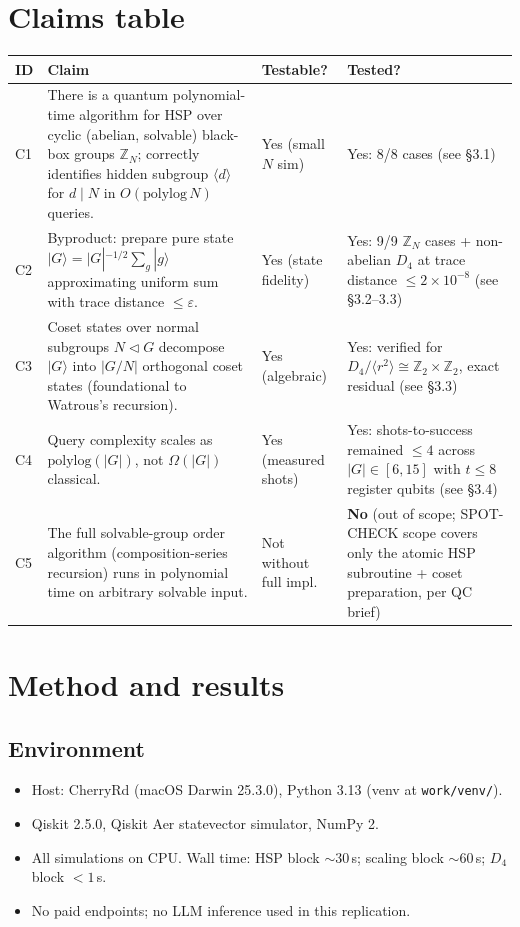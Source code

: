 \documentclass[11pt]{article}
\begin{document}
\section{Claims table}
\begin{center}\small
\begin{tabular}{@{}lp{7.5cm}ll@{}}
\toprule
\textbf{ID} & \textbf{Claim} & \textbf{Testable?} & \textbf{Tested?}\\
\midrule
C1 & There is a quantum polynomial-time algorithm for HSP over cyclic (abelian, solvable) black-box groups $\mathbb{Z}_N$; correctly identifies hidden subgroup $\langle d\rangle$ for $d\mid N$ in $O(\text{polylog}\,N)$ queries. & Yes (small $N$ sim) & Yes: 8/8 cases (see \S3.1) \\
C2 & Byproduct: prepare pure state $|G\rangle = |G|^{-1/2}\sum_g |g\rangle$ approximating uniform sum with trace distance $\le \varepsilon$. & Yes (state fidelity) & Yes: 9/9 $\mathbb{Z}_N$ cases + non-abelian $D_4$ at trace distance $\le 2\times 10^{-8}$ (see \S3.2--3.3) \\
C3 & Coset states over normal subgroups $N \triangleleft G$ decompose $|G\rangle$ into $|G/N|$ orthogonal coset states (foundational to Watrous's recursion). & Yes (algebraic) & Yes: verified for $D_4/\langle r^2\rangle \cong \mathbb{Z}_2 \times \mathbb{Z}_2$, exact residual (see \S3.3) \\
C4 & Query complexity scales as $\mathrm{polylog}(|G|)$, not $\Omega(|G|)$ classical. & Yes (measured shots) & Yes: shots-to-success remained $\le 4$ across $|G| \in [6,15]$ with $t \le 8$ register qubits (see \S3.4) \\
C5 & The full solvable-group order algorithm (composition-series recursion) runs in polynomial time on arbitrary solvable input. & Not without full impl. & \textbf{No} (out of scope; SPOT-CHECK scope covers only the atomic HSP subroutine + coset preparation, per QC brief) \\
\bottomrule
\end{tabular}
\end{center}

\section{Method and results}

\subsection{Environment}
\begin{itemize}\itemsep0pt
    \item Host: CherryRd (macOS Darwin 25.3.0), Python 3.13 (venv at \texttt{work/venv/}).
    \item Qiskit 2.5.0, Qiskit Aer statevector simulator, NumPy 2.
    \item All simulations on CPU. Wall time: HSP block $\sim 30$\,s; scaling block $\sim 60$\,s;
    $D_4$ block $< 1$\,s.
    \item No paid endpoints; no LLM inference used in this replication.
\end{itemize}
\end{document}
